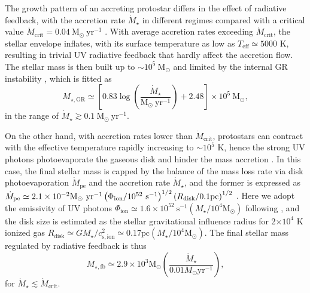 \documentclass[twocolumn, twocolappendix]{aastex63}
\newcommand{\Msun}{\mathrm{M_\odot}}
\newcommand{\Msunyr}{\mathrm{M_\odot~yr^{-1}}}
\newcommand{\Mdot}{\dot{M}}
\begin{document}
\begin{CJK*}{UTF8}{gbsn}
The growth pattern of an accreting protostar differs in the effect of radiative feedback,
with the accretion rate $\Mdot_\star$ in different regimes compared with a critical value $\dot{M}_{\mathrm{crit}}=0.04~\Msunyr$ 
\citep{2001ApJ...561L..55O,2013ApJ...778..178H,2013A&A...558A..59S,2015MNRAS.452..755S,2018MNRAS.474.2757H}.
With average accretion rates exceeding $\Mdot_\mathrm{crit}$, the stellar envelope inflates, 
with its surface temperature as low as $T_\mathrm{eff} \simeq 5000$ K, 
resulting in trivial UV radiative feedback that hardly affect the accretion flow. 
The stellar mass is then built up to $\sim 10^5~\Msun$ and limited by the internal GR instability 
\citep{2016PhRvD..94b1501S,2017ApJ...842L...6W,2019PASA...36...27W}, which is fitted as 
\begin{equation*}
 M_{\star, \mathrm{GR}} \simeq\left[0.83 \log \left(\frac{\dot{M}_{\star}}{\Msunyr}\right)+2.48\right] \times 10^{5} ~\Msun,
\end{equation*}
in the range of $\dot{M}_\star\gtrsim 0.1~\Msunyr$.

On the other hand, with accretion rates lower than $\Mdot_\mathrm{crit}$, 
protostars can contract with the effective temperature rapidly increasing to $\sim 10^5$ K, 
hence the strong UV photons photoevaporate the gaseous disk and hinder the mass accretion 
\citep{2008ApJ...681..771M,2011Sci...334.1250H}. 
In this case, the final stellar mass is capped by the balance of the mass loss rate via disk photoevaporation $\dot{M}_{\mathrm{pe}}$
and the accretion rate $\dot{M}_{\star}$, and the former is expressed as 
$\dot{M}_{\mathrm{pe}} \simeq 2.1 \times 10^{-2} \Msunyr \left( \Phi_{\mathrm{ion}}/10^{52} \mathrm{~s}^{-1}\right)^{1 / 2}\left(R_{\rm{disk}}/0.1 \mathrm{pc}\right)^{1/2}$ 
\citep{2013ApJ...773..155T}.
Here we adopt the emissivity of UV photons $\Phi_{\mathrm{ion}} \simeq 1.6 \times 10^{52} \mathrm{~s}^{-1}\left(M_{\star} / 10^{4} \Msun \right)$ following \citet{2012ApJ...750...66J}, 
and the disk size is estimated as the stellar gravitational influence radius for 2$\times 10^4$ K ionized gas 
$R_{\mathrm{disk}} \simeq  G M_{\star}/c_{\mathrm{s}, \mathrm{ion}}^{2} \simeq 0.17 \mathrm{pc}\left( M_{\star}/ 10^{4} \Msun \right)$.
The final stellar mass regulated by radiative feedback is thus 
\begin{equation*}
M_{\star, \mathrm{fb}} \simeq 2.9 \times 10^{3} \Msun\left(\frac{\dot{M}_{\star}}{0.01 M_{\odot} \mathrm{yr}^{-1}}\right), 
\end{equation*}
for $\Mdot_\star\lesssim \Mdot_\mathrm{crit}$. 


\end{CJK*}
\end{document}

